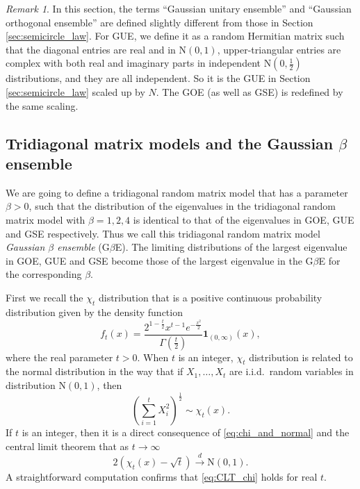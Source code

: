 \documentclass[11pt, a4paper]{article}
\numberwithin{equation}{section}
\newcommand{\id}{\mathbf{1}}
\newcommand{\iid}{i.i.d.}
\newcommand{\todistr}{\stackrel{d}{\rightarrow}}
\newcommand{\Normal}{\mathrm{N}}
\theoremstyle{definition}
\theoremstyle{remark}
\newtheorem{rmk}{Remark}
\begin{document}
\begin{rmk}
  In this section, the terms ``Gaussian unitary ensemble'' and ``Gaussian orthogonal ensemble'' are defined slightly different from those in Section \ref{sec:semicircle_law}. For GUE, we define it as a random Hermitian matrix such that the diagonal entries are real and in $\Normal(0, 1)$, upper-triangular entries are complex with both real and imaginary parts in independent $\Normal(0, \frac{1}{2})$ distributions, and they are all independent. So it is the GUE in Section \ref{sec:semicircle_law} scaled up by $N$. The GOE (as well as GSE) is redefined by the same scaling.
\end{rmk}

\subsection{Tridiagonal matrix models and the Gaussian $\beta$ ensemble}

We are going to define a tridiagonal random matrix model that has a parameter $\beta > 0$, such that the distribution of the eigenvalues in the tridiagonal random matrix model with $\beta = 1, 2, 4$ is identical to that of the eigenvalues in GOE, GUE and GSE respectively. Thus we call this tridiagonal random matrix model \emph{Gaussian $\beta$ ensemble} (G$\beta$E). The limiting distributions of the largest eigenvalue in GOE, GUE and GSE become those of the largest eigenvalue in the G$\beta$E for the corresponding $\beta$.

First we recall the $\chi_t$ distribution that is a positive continuous probability distribution given by the density function
\begin{equation}
  f_t(x) = \frac{2^{1 - \frac{t}{2}} x^{t - 1} e^{-\frac{x^2}{2}}}{\Gamma(\frac{t}{2})} \id_{(0, \infty)}(x),
\end{equation}
where the real parameter $t > 0$. When $t$ is an integer, $\chi_t$ distribution is related to the normal distribution in the way that if $X_1, \dotsc, X_t$ are \iid\ random variables in distribution $\Normal(0, 1)$, then
\begin{equation} \label{eq:chi_and_normal}
  \left( \sum^t_{i = 1} X^2_i \right)^{\frac{1}{2}} \sim \chi_t(x).
\end{equation}
If $t$ is an integer, then it is a direct consequence of \eqref{eq:chi_and_normal} and the central limit theorem that as $t \to \infty$
\begin{equation} \label{eq:CLT_chi}
  2(\chi_t(x) - \sqrt{t}) \todistr \Normal(0, 1).
\end{equation}
A straightforward computation confirms that \eqref{eq:CLT_chi} holds for real $t$.
\end{document}
